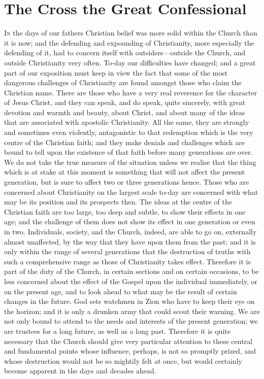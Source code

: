 \documentclass[draft]{ptfdoc}
\begin{document}
\chapter{The Cross the Great Confessional} 



\textsc{In} the days of our fathers Christian belief 
was more solid within the Church than it 
is now; and the defending and expounding of 
Christianity, more especially the defending of 
it, had to concern itself with outsiders---outside 
the Church, and outside Christianity very often. 
To-day our difficulties have changed; and a 
great part of our exposition must keep in view 
the fact that some of the most dangerous challenges 
of Christianity are found amongst those 
who claim the Christian name. There are those 
who have a very real reverence for the character 
of Jesus Christ, and they can speak, and 
do speak, quite sincerely, with great devotion 
and warmth and beauty, about Christ, and 
about many of the ideas that are associated 
with apostolic Christianity. All the same, they 
are strongly and sometimes even violently, 
antagonistic to that redemption which is the 
very centre of the Christian faith; and they 
make denials and challenges which are bound 
to tell upon the existence of that faith before 
many generations are over. We do not take 
the true measure of the situation unless we 
realise that the thing which is at stake at this 
moment is something that will not affect the 
present generation, but is sure to affect two or 
three generations hence. Those who are concerned 
about Christianity on the largest scale 
to-day are concerned with what may be its 
position and its prospects then. The ideas at 
the centre of the Christian faith are too large, 
too deep and subtle, to show their effects 
in one age; and the challenge of them does 
not show its effect in one generation or even 
in two. Individuals, society, and the Church, 
indeed, are able to go on, externally almost unaffected, 
by the way that they have upon them 
from the past; and it is only within the range 
of several generations that the destruction of 
truths with such a comprehensive range as 
those of Christianity takes effect. Therefore it 
is part of the duty of the Church, in certain 
sections and on certain occasions, to be less 
concerned about the effect of the Gospel upon 
the individual immediately, or on the present 
age, and to look ahead to what may be the 
result of certain changes in the future. God 
sets watchmen in Zion who have to keep their 
eye on the horizon; and it is only a drunken 
army that could scout their warning. We are 
not only bound to attend to the needs and 
interests of the present generation; we are 
trustees for a long future, as well as a long 
past. Therefore it is quite necessary that the 
Church should give very particular attention 
to these central and fundamental points whose 
influence, perhaps, is not so promptly prized, 
and whose destruction would not be so mightily 
felt at once, but would certainly become apparent 
in the days and decades ahead. 
\end{document}

